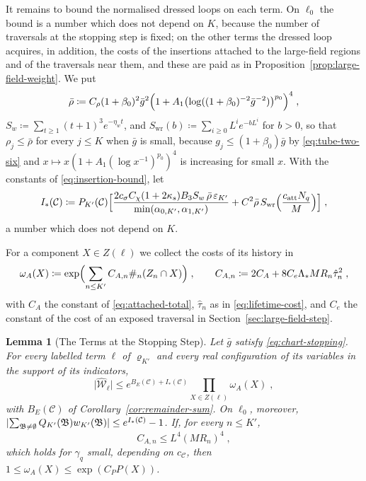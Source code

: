 \documentclass[11pt]{preprint}
\DeclarePairedDelimiter{\abs}{\lvert}{\rvert}
\numberwithin{equation}{section}
\newtheorem{lemma}[theorem]{Lemma}
\theoremstyle{definition}
\theoremstyle{remark}
\theoremstyle{plain}
\begin{document}
It remains to bound the normalised dressed loops on each term. On $\ell_0$ the bound is a number which does not depend on $K$, because the number of traversals at the stopping step is fixed; on the other terms the dressed loop acquires, in addition, the costs of the insertions attached to the large-field regions and of the traversals near them, and these are paid as in Proposition~\ref{prop:large-field-weight}. We put
\begin{equation}\label{eq:sup-amplitudes}
    \bar\rho \coloneqq C_\rho(1 + \beta_0)^2\bar g^2\Bigl(1 + A_1\bigl(\log((1 + \beta_0)^{-2}\bar g^{-2})\bigr)^{p_0}\Bigr)^4\;,
\end{equation}
$S_w \coloneqq \sum_{t \geq 1}(t + 1)^3e^{-\eta_wt}$, and $S_{\mathrm{wr}}(b) \coloneqq \sum_{i \geq 0}L^ie^{-bL^i}$ for $b > 0$, so that $\rho_j \leq \bar\rho$ for every $j \leq K$ when $\bar g$ is small, because $g_j \leq (1 + \beta_0)\bar g$ by \eqref{eq:tube-two-six} and $x \mapsto x(1 + A_1(\log x^{-1})^{p_0})^4$ is increasing for small $x$. With the constants of \eqref{eq:insertion-bound}, let
\begin{equation}\label{eq:insertion-total}
    I_*(\mathcal C) \coloneqq P_{K'}(\mathcal C)\Bigl[\frac{2c_\sigma C_\chi(1 + 2\kappa_s)B_3S_w\,\bar\rho\,\varepsilon_{K'}}{\min(\alpha_{0,K'}, \alpha_{1,K'})} + C^2\bar\rho\,S_{\mathrm{wr}}\Bigl(\frac{c_{\mathrm{att}}N_q}{M}\Bigr)\Bigr]\;,
\end{equation}
a number which does not depend on $K$.

For a component $X \in Z(\ell)$ we collect the costs of its history in
\begin{equation}\label{eq:attached-weight}
    \omega_A(X) \coloneqq \exp\Bigl(\sum_{n \leq K'}C_{A,n}\#_n(Z_n \cap X)\Bigr)\;,
    \qquad
    C_{A,n} \coloneqq 2C_A + 8C_e\Lambda_*MR_n\hat\tau_n^2\;,
\end{equation}
with $C_A$ the constant of \eqref{eq:attached-total}, $\hat\tau_n$ as in \eqref{eq:lifetime-cost}, and $C_e$ the constant of the cost of an exposed traversal in Section~\ref{sec:large-field-step}.

\begin{lemma}[The Terms at the Stopping Step]\label{lem:term-bound}
Let $\bar g$ satisfy \eqref{eq:chart-stopping}. For every labelled term $\ell$ of $\varrho_{K'}$ and every real configuration of its variables in the support of its indicators,
\begin{equation}\label{eq:term-bound}
    \bigl\lvert\widehat{\mathcal W}_\ell\bigr\rvert \leq e^{B_E(\mathcal C) + I_*(\mathcal C)}\prod_{X \in Z(\ell)}\omega_A(X)\;,
\end{equation}
with $B_E(\mathcal C)$ of Corollary~\ref{cor:remainder-sum}. On $\ell_0$, moreover, $\abs{\sum_{\mathfrak B \neq \emptyset}Q_{K'}(\mathfrak B)w_{K'}(\mathfrak B)} \leq e^{I_*(\mathcal C)} - 1$. If, for every $n \leq K'$,
\begin{equation}\label{eq:attached-condition}
    C_{A,n} \leq L^4(MR_n)^4\;,
\end{equation}
which holds for $\gamma_q$ small, depending on $c_{\mathcal C}$, then $1 \leq \omega_A(X) \leq \exp(C_PP(X))$.
\end{lemma}
\end{document}
